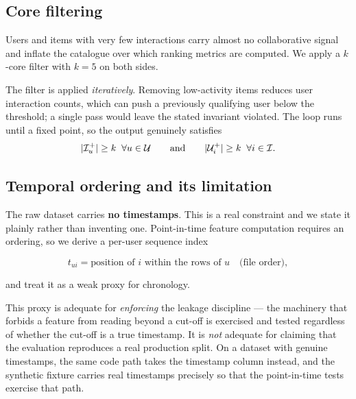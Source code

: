 \subsection{Core filtering}

Users and items with very few interactions carry almost no collaborative
signal and inflate the catalogue over which ranking metrics are computed. We
apply a $k$-core filter with $k = 5$ on both sides.

The filter is applied \emph{iteratively}. Removing low-activity items reduces
user interaction counts, which can push a previously qualifying user below the
threshold; a single pass would leave the stated invariant violated. The loop
runs until a fixed point, so the output genuinely satisfies
\begin{equation}
  |\mathcal{I}_u^{+}| \geq k \;\;\forall u \in \mathcal{U}
  \qquad\text{and}\qquad
  |\mathcal{U}_i^{+}| \geq k \;\;\forall i \in \mathcal{I} .
\end{equation}

\subsection{Temporal ordering and its limitation}

The raw dataset carries \textbf{no timestamps}. This is a real constraint and
we state it plainly rather than inventing one. Point-in-time feature
computation requires an ordering, so we derive a per-user sequence index

\begin{equation}
  t_{ui} = \text{position of } i \text{ within the rows of } u
  \quad\text{(file order)} ,
\end{equation}

and treat it as a weak proxy for chronology.

This proxy is adequate for \emph{enforcing} the leakage discipline --- the
machinery that forbids a feature from reading beyond a cut-off is exercised
and tested regardless of whether the cut-off is a true timestamp. It is
\emph{not} adequate for claiming that the evaluation reproduces a real
production split. On a dataset with genuine timestamps, the same code path
takes the timestamp column instead, and the synthetic fixture carries real
timestamps precisely so that the point-in-time tests exercise that path.
